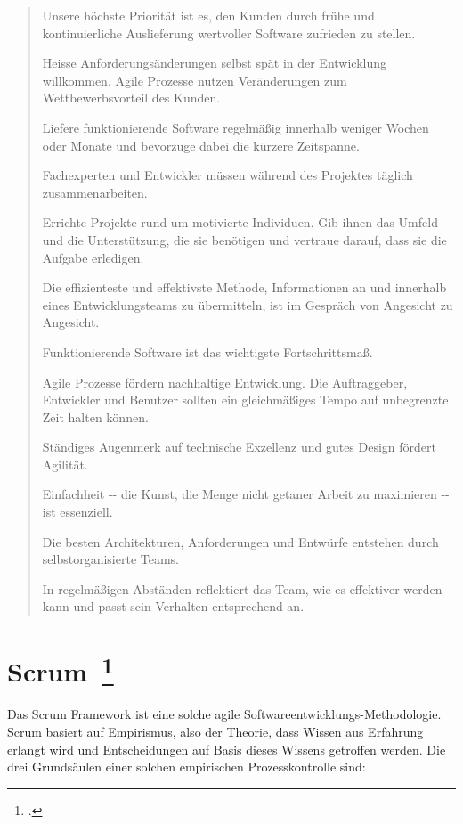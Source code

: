 \begin{quote}Unsere höchste Priorität ist es, den Kunden durch frühe und kontinuierliche Auslieferung wertvoller Software zufrieden zu stellen.

Heisse Anforderungsänderungen selbst spät in der Entwicklung willkommen. Agile Prozesse nutzen Veränderungen zum Wettbewerbsvorteil des Kunden.

Liefere funktionierende Software regelmäßig innerhalb weniger Wochen oder Monate und bevorzuge dabei die kürzere Zeitspanne.

Fachexperten und Entwickler müssen während des Projektes täglich zusammenarbeiten.

Errichte Projekte rund um motivierte Individuen. Gib ihnen das Umfeld und die Unterstützung, die sie benötigen und vertraue darauf, dass sie die Aufgabe erledigen.

Die effizienteste und effektivste Methode, Informationen an und innerhalb eines Entwicklungsteams zu übermitteln, ist im Gespräch von Angesicht zu Angesicht.

Funktionierende Software ist das wichtigste Fortschrittsmaß.

Agile Prozesse fördern nachhaltige Entwicklung. Die Auftraggeber, Entwickler und Benutzer sollten ein gleichmäßiges Tempo auf unbegrenzte Zeit halten können.

Ständiges Augenmerk auf technische Exzellenz und gutes Design fördert Agilität.

Einfachheit -\phantom{}- die Kunst, die Menge nicht getaner Arbeit zu maximieren -\phantom{}- ist essenziell.

Die besten Architekturen, Anforderungen und Entwürfe entstehen durch selbstorganisierte Teams.

In regelmäßigen Abständen reflektiert das Team, wie es effektiver werden kann und passt sein Verhalten entsprechend an.\end{quote}\cite{agile_principles}

\newpage
\section{Scrum~\footcite[vgl.][S.13ff]{scrum_kurz_gut_2013}}

Das Scrum Framework ist eine solche agile Softwareentwicklungs-Methodologie. 
Scrum basiert auf Empirismus, also der Theorie, dass Wissen aus Erfahrung erlangt wird und Entscheidungen auf Basis dieses Wissens getroffen werden. 
Die drei Grundsäulen einer solchen empirischen Prozesskontrolle sind:

